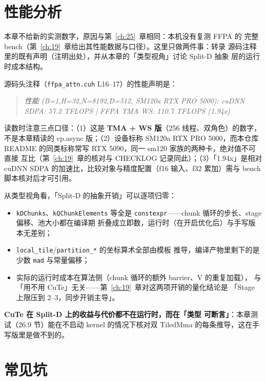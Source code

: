 \section{性能分析}

本章不给新的实测数字，原因与第~\ref{ch:25}~章相同：本机没有复测 FFPA 的
完整 bench（第~\ref{ch:19}~章给出其性能数据与口径）。这里只做两件事：转录
源码注释里的既有声明（注明出处），并从本章的「类型视角」讨论 Split-D 抽象
层的运行时成本结构。

源码头注释（\texttt{ffpa\_\allowbreak{}attn.\allowbreak{}cuh} L16--17）的性能声明是：

\begin{quote}
  \textit{性能 (B=1,H=32,N=8192,D=512, SM120a RTX PRO 5000):
  cuDNN SDPA: 57.2 TFLOPS | FFPA TMA WS: 110.7 TFLOPS (1.94x)}
\end{quote}

读数时注意三点口径：（1）这是 \textbf{TMA + WS 版}（256 线程、双角色）的数字，
不是本章精读的 cp.async 版；（2）设备标称 SM120a RTX PRO 5000，而本仓库
README 的同类标称常写 RTX 5090，同一 sm120 家族的两种卡，绝对值不可直接
互比（第~\ref{ch:19}~章的核对与 CHECKLOG 记录同此）；（3）「1.94x」是相对
cuDNN SDPA 的加速比，比较对象与精度配置（f16 输入、f32 累加）需与 bench
脚本核对后才可引用。

从类型视角看，「Split-D 的抽象开销」可以逐项归零：

\begin{itemize}[itemsep=2pt,topsep=2pt]
  \item \texttt{kDChunks}、\texttt{k\allowbreak{}QChunk\allowbreak{}Elements} 等全是
        \texttt{constexpr}——chunk 循环的步长、stage 偏移、池大小都在编译期
        折叠成立即数，运行时（在开启优化后）与手写版本无差别；
  \item \texttt{local\_tile}/\texttt{partition\_*} 的坐标算术全部由模板
        推导，编译产物里剩下的是少数 \texttt{mad} 与常量偏移；
  \item 实际的运行时成本在算法侧（chunk 循环的额外 barrier、V 的重复加载），
        与「用不用 CuTe」无关——第~\ref{ch:19}~章对这两项开销的量化结论是
        「Stage 上限压到 2--3，同步开销主导」。
\end{itemize}

\textbf{CuTe 在 Split-D 上的收益与代价都不在运行时，而在「类型
可断言」}：本章测试（26.9 节）能在不启动 kernel 的情况下核对双 TiledMma
的每条推导，这在手写版里是做不到的。

\section{常见坑}

